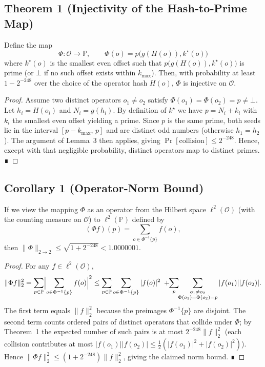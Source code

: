 \documentclass[11pt]{article}
\begin{document}
\subsection{Theorem 1 (Injectivity of the Hash‑to‑Prime Map)}
Define the map
\[
\Phi:\mathcal{O}\longrightarrow\mathbb{P},\qquad
\Phi(o)=p\bigl(g(H(o)),k^\star(o)\bigr)
\]
where $k^\star(o)$ is the smallest even offset such that
$p\bigl(g(H(o)),k^\star(o)\bigr)$ is prime (or $\bot$ if no such offset exists
within $k_{\max}$).  Then, with probability at least $1-2^{-248}$ over the
choice of the operator hash $H(o)$, $\Phi$ is injective on $\mathcal{O}$.
\begin{proof}
  Assume two distinct operators $o_1\neq o_2$ satisfy $\Phi(o_1)=\Phi(o_2)=p\neq\bot$.
  Let $h_i=H(o_i)$ and $N_i=g(h_i)$.  By definition of $k^\star$ we have
  $p=N_i+k_i$ with $k_i$ the smallest even offset yielding a prime.
  Since $p$ is the same prime, both seeds lie in the interval
  $[p-k_{\max},\,p]$ and are distinct odd numbers (otherwise $h_1=h_2$).
  The argument of Lemma~3 then applies, giving
  $\Pr[\text{collision}]\le2^{-248}$.
  Hence, except with that negligible probability, distinct operators map to
  distinct primes.  ∎
\end{proof}

\subsection{Corollary 1 (Operator‑Norm Bound)}
If we view the mapping $\Phi$ as an operator from the Hilbert space
$\ell^{2}(\mathcal{O})$ (with the counting measure on $\mathcal{O}$) to
$\ell^{2}(\mathbb{P})$ defined by
\[
(\Phi f)(p)=\sum_{o\in\Phi^{-1}\{p\}}f(o),
\]
then $\|\Phi\|_{2\to2}\le\sqrt{1+2^{-248}}<1.0000001$.
\begin{proof}
  For any $f\in\ell^{2}(\mathcal{O})$,
  \[
    \|\Phi f\|_{2}^{2}
    =\sum_{p\in\mathbb{P}}\Bigl|\sum_{o\in\Phi^{-1}\{p\}}f(o)\Bigr|^{2}
    \le\sum_{p\in\mathbb{P}}\sum_{o\in\Phi^{-1}\{p\}}|f(o)|^{2}
      \;+\!\!\sum_{p}\!\!\sum_{\substack{o_1\neq o_2\\ \Phi(o_1)=\Phi(o_2)=p}}
            |f(o_1)||f(o_2)|.
  \]
  The first term equals $\|f\|_{2}^{2}$ because the preimages $\Phi^{-1}\{p\}$ are
  disjoint.  The second term counts ordered pairs of distinct operators that
  collide under $\Phi$; by Theorem~1 the expected number of such pairs is at most
  $2^{-248}\|f\|_{2}^{2}$ (each collision contributes at most $|f(o_1)||f(o_2)|
  \le\frac12(|f(o_1)|^{2}+|f(o_2)|^{2})$).  Hence
  $\|\Phi f\|_{2}^{2}\le(1+2^{-248})\|f\|_{2}^{2}$, giving the claimed norm bound. ∎
\end{proof}
\end{document}

